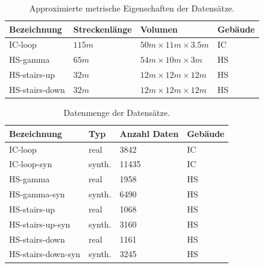 \begin{table}
	\centering
	\caption{Approximierte metrische Eigenschaften der Datensätze.}
	\begin{tabularx}{1.0\textwidth}{X X X >{\centering\arraybackslash}p{1.7cm} }
		\textbf{Bezeichnung} & \textbf{Streckenlänge} & \textbf{Volumen} & \textbf{Gebäude}\\
		\hline
		IC-loop & $115m$ & $50m \times 11m \times 3.5m$ & IC \\
		\hline
		HS-gamma & $65m$ & $54m \times 10m \times 3m$ & HS\\
		\hline
		HS-stairs-up & $32m$ & $12m \times 12m \times 12m$ & HS\\
		\hline
		HS-stairs-down & $32m$ & $12m \times 12m \times 12m$ & HS\\
	\end{tabularx}
	\label{tab:dataset_metrics}
\end{table}


\begin{table}
	\centering
	\caption{Datenmenge der Datensätze.}
	\begin{tabularx}{1.0\textwidth}{p{3.5cm} p{1.8cm} X  >{\centering\arraybackslash}p{1.7cm} }
		\textbf{Bezeichnung} & \textbf{Typ} & \textbf{Anzahl Daten} & \textbf{Gebäude}\\
		\hline
		IC-loop & real & 3842 & IC\\
		\hline
		IC-loop-syn & synth. & 11435 & IC\\
		\hline
		HS-gamma & real & 1958 & HS\\
		\hline
		HS-gamma-syn & synth. &  6490 & HS\\
		\hline
		HS-stairs-up & real & 1068 & HS\\
		\hline
		HS-stairs-up-syn & synth. & 3160 & HS\\
		\hline
		HS-stairs-down & real & 1161 & HS\\
		\hline
		HS-stairs-down-syn & synth. &  3245 & HS\\
	\end{tabularx}
	\label{tab:datasets}
\end{table}


